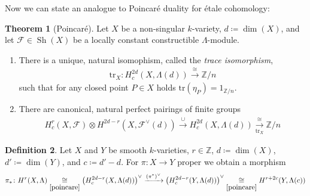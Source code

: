 \documentclass[english]{scrartcl}
\theoremstyle{definition}
\newtheorem{Def}{Definition}[section]
\newtheorem{Thm}[Def]{Theorem}
\newtheorem{Cor}[Def]{Corollary}
\theoremstyle{remark}
\newcommand*{\Z}{\mathds{Z}}
\newcommand*{\Zmod}[1]{\Z/#1} %
\newcommand*{\F}{\mathcal{F}} %
\DeclareMathOperator{\Sh}{Sh} %
\newcommand*{\Tr}{\text{tr}} %
\newcommand*{\tr}[1]{\Tr\left(#1\right)} %
\begin{document}
Now we can state an analogue to Poincaré duality for étale cohomology:
\begin{Thm}[Poincaré]\label{poincare}
  Let $X$ be a non-singular $k$-variety,
  $d\coloneqq\dim(X)$,
  and let $\F\in\Sh(X)$ be a locally constant constructible
  $\Lambda$-module.
  \begin{enumerate}
  \item There is a unique, natural isomophism,
    called the \emph{trace isomorphism},
    \begin{gather*}
      \Tr_X\colon H_c^{2d}(X,\Lambda(d)) \xrightarrow{\cong} \Zmod{n}
    \end{gather*}
    such that for any closed point $P\in X$ holds
    $\tr{\eta_P}=1_{\Zmod{n}}$.
  \item There are canonical, natural perfect pairings of finite groups
    \begin{gather*}
      H_c^r(X,\F) \otimes H^{2d-r}\left(X,\F^\vee(d)\right)
      \overset\cup\longrightarrow H_c^{2d}(X,\Lambda(d))
      \xrightarrow[\Tr_X]{\cong} \Zmod{n}
    \end{gather*}
  \end{enumerate}
\end{Thm}




\begin{Def}\label{def:pushforward}
  Let $X$ and $Y$ be smooth $k$-varieties, $r\in\Z$,
  $d\coloneqq\dim(X)$, $d'\coloneqq\dim(Y)$, and $c\coloneqq d'-d$.
  For $\pi\colon X\to Y$ proper we obtain a morphism
  \begin{gather*}
    \pi_*\colon
    H^r(X,\Lambda)
    \underset{\ref{poincare}}\cong
    \left(H_c^{2d-r}(X,\Lambda(d))\right)^\vee
    \xrightarrow{(\pi^*)^\vee}
    \left(H_c^{2d-r}(Y,\Lambda(d))\right)^\vee
    \underset{\ref{poincare}}\cong
    H^{r+2c}(Y,\Lambda(c))
  \end{gather*}
\end{Def}
\end{document}
